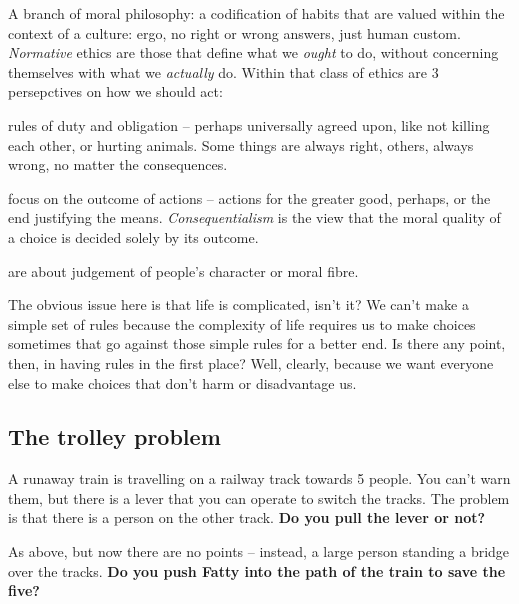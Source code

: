 \documentclass[
]{book}
\providecommand{\tightlist}{%
  \setlength{\itemsep}{0pt}\setlength{\parskip}{0pt}}
\begin{document}
A branch of moral philosophy: a codification of habits that are valued within the context of a culture: ergo, no right or wrong answers, just human custom. \emph{Normative} ethics are those that define what we \emph{ought} to do, without concerning themselves with what we \emph{actually} do. Within that class of ethics are 3 persepctives on how we should act:

\begin{description}
\tightlist
\item[Deontological ethics (rules)]
rules of duty and obligation -- perhaps universally agreed upon, like not killing each other, or hurting animals. Some things are always right, others, always wrong, no matter the consequences.
\item[Teleological ethics (consequences)]
focus on the outcome of actions -- actions for the greater good, perhaps, or the end justifying the means. \emph{Consequentialism} is the view that the moral quality of a choice is decided solely by its outcome.
\item[Virtue ethics]
are about judgement of people's character or moral fibre.
\end{description}

The obvious issue here is that life is complicated, isn't it? We can't make a simple set of rules because the complexity of life requires us to make choices sometimes that go against those simple rules for a better end. Is there any point, then, in having rules in the first place? Well, clearly, because we want everyone else to make choices that don't harm or disadvantage us.

\hypertarget{the-trolley-problem}{%
\subsection{The trolley problem}\label{the-trolley-problem}}

\begin{description}
\tightlist
\item[Scenario 1]
A runaway train is travelling on a railway track towards 5 people. You can't warn them, but there is a lever that you can operate to switch the tracks. The problem is that there is a person on the other track. \textbf{Do you pull the lever or not?}
\item[Scenario 2]
As above, but now there are no points -- instead, a large person standing a bridge over the tracks. \textbf{Do you push Fatty into the path of the train to save the five?}
\end{description}
\end{document}
